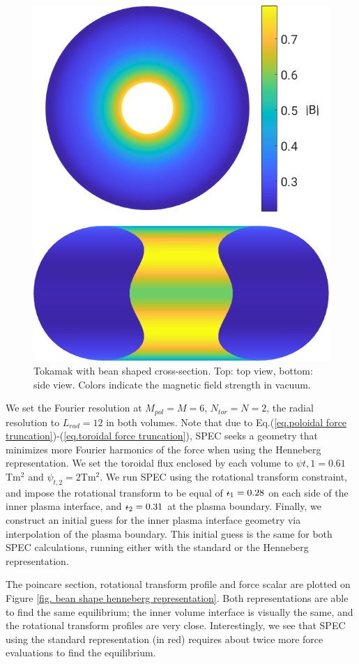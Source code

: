 \documentclass[my_thesis.tex]{subfiles}
\begin{document}
\begin{figure}
	\centering
	\includegraphics[width=.8\linewidth]{images/HennebergRepresentation/BeanShape_modB_boundary.png}
	\caption{Tokamak with bean shaped cross-section. Top: top view, bottom: side view. Colors indicate the magnetic field strength in vacuum.}
	\label{fig. bean shaped tokamak geometry}
\end{figure}
We set the Fourier resolution at $M_{pol}=M=6$, $N_{tor}=N=2$, the radial resolution to $L_{rad}=12$ in both volumes. Note that due to Eq.(\ref{eq.poloidal force truncation})-(\ref{eq.toroidal force truncation}), SPEC seeks a geometry that minimizes more Fourier harmonics of the force when using the Henneberg representation. We set the toroidal flux enclosed by each volume to $\psi{t,1}=0.61$Tm${}^2$ and $\psi_{t,2}=2$Tm${}^2$. We run SPEC using the rotational transform constraint, and impose the rotational transform to be equal of $\text{$\iota\!\!$-}_1=0.28$ on each side of the inner plasma interface, and $\text{$\iota\!\!$-}_2=0.31$ at the plasma boundary. Finally, we construct an initial guess for the inner plasma interface geometry via interpolation of the plasma boundary. This initial guess is the same for both SPEC calculations, running either with the standard or the Henneberg representation.

The poincare section, rotational transform profile and force scalar are plotted on Figure \ref{fig. bean shape henneberg representation}. Both representations are able to find the same equilibrium; the inner volume interface is visually the same, and the rotational transform profiles are very close. Interestingly, we see that SPEC using the standard representation (in red) requires about twice more force evaluations to find the equilibrium. 
\end{document}
